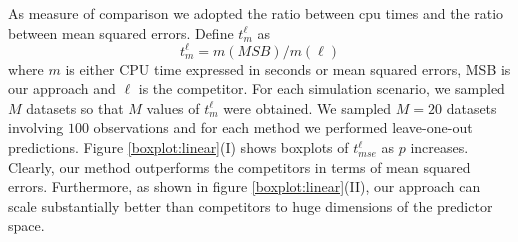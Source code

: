 \documentclass{article} %
\begin{document}
As measure of comparison we adopted the ratio between cpu times and the ratio between mean squared errors. Define $t_{m}^{\ell}$ as $$t_{m}^{\ell}=m(MSB)/m(\ell)$$
where $m$ is either CPU time expressed in seconds or mean squared errors, MSB is our approach and $\ell$ is the competitor. For each simulation scenario, we sampled $M$ datasets so that $M$ values of $t_{m}^{\ell}$ were obtained. We sampled $M=20$ datasets involving $100$ observations and for each method we performed leave-one-out predictions. Figure \ref{boxplot:linear}(I) shows boxplots of $t_{mse}^{\ell}$ as $p$ increases. Clearly, our method outperforms the competitors in terms of mean squared errors. Furthermore, as shown in figure \ref{boxplot:linear}(II), our approach can scale substantially better than competitors to huge dimensions of the predictor space. 
\end{document}
